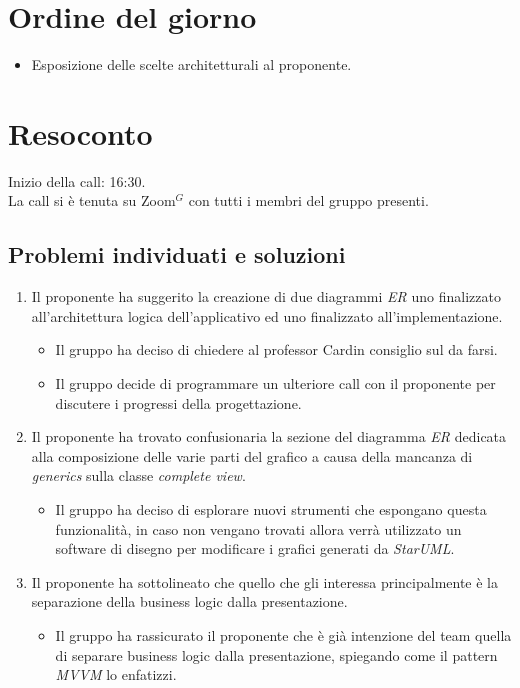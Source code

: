\section{Ordine del giorno}

\begin{itemize}
	\item Esposizione delle scelte architetturali al proponente.
\end{itemize}

\section{Resoconto}
\label{sec:Resoconto}

\noindent
Inizio della call: 16:30. \\
\noindent La call si è tenuta su Zoom$^{G}$ con tutti i membri del gruppo presenti.

\subsection{Problemi individuati e soluzioni}
\begin{enumerate}
	\item Il proponente ha suggerito la creazione di due diagrammi \textit{ER} uno finalizzato all'architettura logica dell'applicativo ed uno finalizzato all'implementazione.
		  \begin{itemize}
			  \item Il gruppo ha deciso di chiedere al professor Cardin consiglio sul da farsi.
			  \item Il gruppo decide di programmare un ulteriore call con il proponente per discutere i progressi della progettazione.
		  \end{itemize}
	\item Il proponente ha trovato confusionaria la sezione del diagramma \textit{ER} dedicata alla composizione delle varie parti del grafico a causa della mancanza di \textit{generics} sulla classe \textit{complete view}.
		  \begin{itemize}
			  \item Il gruppo ha deciso di esplorare nuovi strumenti che espongano questa funzionalità, in caso non vengano trovati allora verrà utilizzato un software di disegno per modificare i grafici generati da \textit{StarUML}.
		  \end{itemize}
	\item Il proponente ha sottolineato che quello che gli interessa principalmente è la separazione della business logic dalla presentazione.
		  \begin{itemize}
			  \item Il gruppo ha rassicurato il proponente che è già intenzione del team quella di separare business logic dalla presentazione, spiegando come il pattern \textit{MVVM} lo enfatizzi.
		  \end{itemize}
\end{enumerate}

